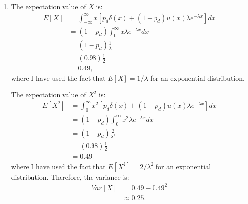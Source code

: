 \begin{problem}{16}
\begin{enumerate}
\item
The expectation value of $X$ is:
\begin{align*}
E[X] &= \int_{-\infty}^{\infty}x\left [p_d \delta(x)+(1-p_d)u(x)\lambda e^{-\lambda x} \right] dx \\
&= (1-p_d)\int_0^{\infty}x\lambda e^{-\lambda x}dx \\
&= (1-p_d)\frac{1}{\lambda} \\
&= (0.98)\frac{1}{2} \\
&=0.49,
\end{align*}
where I have used the fact that $E[X] = 1/\lambda$ for an exponential distribution.

The expectation value of $X^2$ is:
\begin{align*}
E[X^2] &= \int_0^{\infty}x^2\left [p_d \delta(x)+(1-p_d)u(x)\lambda e^{-\lambda x} \right] dx \\
&= (1-p_d)\int_0^{\infty}x^2\lambda e^{-\lambda x}dx \\
&= (1-p_d)\frac{2}{\lambda^2} \\
&= (0.98)\frac{1}{2} \\
&=0.49,
\end{align*}
where I have used the fact that $E[X^2] = 2/\lambda^2$ for an exponential distribution.  Therefore, the variance is:
\begin{align*}
Var[X]&=0.49 - 0.49^2 \\
& \approx 0.25.
\end{align*}
\end{enumerate}
\end{problem}

